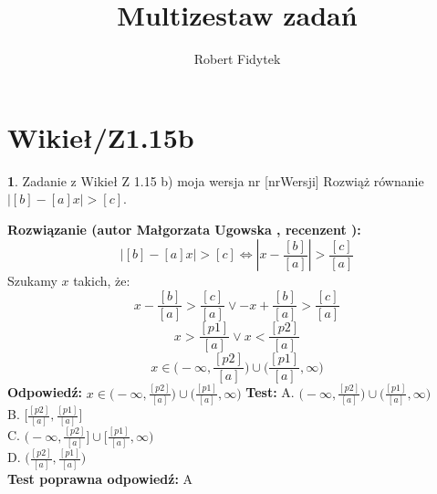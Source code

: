 \documentclass[12pt, a4paper]{article}
\title{Multizestaw zadań}
\author{Robert Fidytek}
\date{}
\theoremstyle{definition} %
\newtheorem{zad}{}
\newcommand{\kategoria}[1]{\section{#1}} %
\newcommand{\zadStart}[1]{\begin{zad}#1\newline} %
\newcommand{\zadStop}{\end{zad}}   %
\newcommand{\rozwStart}[2]{\noindent \textbf{Rozwiązanie (autor #1 , recenzent #2): }\newline} %
\newcommand{\rozwStop}{\newline}                                            %
\newcommand{\odpStart}{\noindent \textbf{Odpowiedź:}\newline}    %
\newcommand{\odpStop}{\newline}                                             %
\newcommand{\testStart}{\noindent \textbf{Test:}\newline} %
\newcommand{\testStop}{\newline} %
\newcommand{\kluczStart}{\noindent \textbf{Test poprawna odpowiedź:}\newline} %
\newcommand{\kluczStop}{\newline} %
\begin{document}
\maketitle


\kategoria{Wikieł/Z1.15b}
\zadStart{Zadanie z Wikieł Z 1.15 b) moja wersja nr [nrWersji]}
Rozwiąż równanie $|[b] - [a]x| > [c]$.
\zadStop
\rozwStart{Małgorzata Ugowska}{}
$$|[b] - [a]x| > [c] \Leftrightarrow |x - \frac{[b]}{[a]}| > \frac{[c]}{[a]}$$ 
Szukamy $x$ takich, że:
$$x - \frac{[b]}{[a]} > \frac{[c]}{[a]} \vee -x + \frac{[b]}{[a]}> \frac{[c]}{[a]}$$
$$x  > \frac{[p1]}{[a]}  \vee x < \frac{[p2]}{[a]}$$
$$x \in \big(-\infty, \frac{[p2]}{[a]}\big) \cup \big(\frac{[p1]}{[a]}, \infty\big)$$
\rozwStop
\odpStart
$x \in \big(-\infty, \frac{[p2]}{[a]}\big) \cup \big(\frac{[p1]}{[a]}, \infty\big)$
\odpStop
\testStart
A. $\big(-\infty, \frac{[p2]}{[a]}\big) \cup \big(\frac{[p1]}{[a]}, \infty\big)$\\
B. $\big[\frac{[p2]}{[a]},\frac{[p1]}{[a]}\big]$\\
C. $\big(-\infty, \frac{[p2]}{[a]}\big] \cup \big[\frac{[p1]}{[a]}, \infty\big)$\\
D. $\big(\frac{[p2]}{[a]},\frac{[p1]}{[a]}\big)$\\
\testStop
\kluczStart
A
\kluczStop
\end{document}
